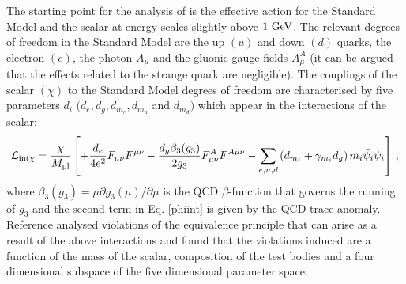 \documentclass[11pt,a4paper]{article}
\begin{document}
The starting point for the analysis of \cite{Damour:2010rp} is the effective action for the Standard Model and the scalar at energy scales
slightly above $1 \ {\rm{GeV}}$. The relevant degrees of freedom in the Standard Model are the up $(u)$ and down $(d)$ quarks, the electron $(e)$, the photon $A_{\mu}$ and the gluonic gauge fields $A_{\mu}^{A}$ (it can be argued that the effects related to the strange quark are negligible). The couplings of the scalar $(\chi)$ to the Standard Model degrees of freedom are characterised by five parameters $d_i$ $(d_e, d_g, d_{m_{e}}, d_{m_{u}}$ and $d_{m_{d}})$ which appear in the interactions of the scalar:
 \begin{equation}
 \label{phiint}
   \mathcal{L}_{\rm{int}\chi} = {\chi \over M_{\rm pl} }\left[ +{d_e  \over 4 e^2 } F_{\mu \nu} F^{\mu \nu} - { {d_g \beta_3(g_3)} \over {2 g_3} } F_{\mu \nu}^{A} F^{A \mu \nu}
  - \sum_{e,u,d} \left(d_{m_i} + \gamma_{m_{i}} d_g \right) m_i \bar{\psi}_i \psi_i \right] \,,
 \end{equation}
 where $\beta_3(g_3) = \mu \partial g_3(\mu)/ \partial \mu$ is the QCD $\beta$-function that governs the running of $g_3$ and the second term in Eq. \eqref{phiint} is given by the QCD trace anomaly.
Reference \cite{Damour:2010rp} analysed violations of the equivalence principle that can arise as a result of the above interactions and found that the violations induced are a function of the mass of the scalar, composition of the test bodies and a four dimensional subspace of the five dimensional parameter space.
 
\end{document}
